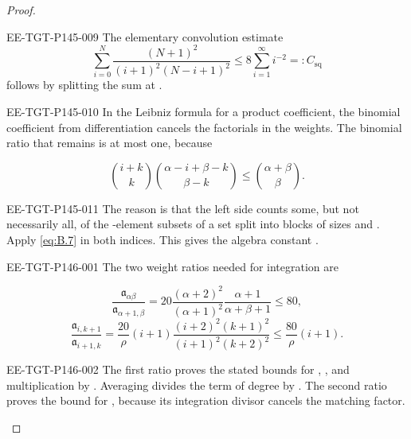 \begin{proof}
\begin{EESegment}{EE-TGT-P145-009}
  The elementary convolution estimate
\begin{equation}
  \sum_{i=0}^{N}\frac{(N+1)^2}{(i+1)^2(N-i+1)^2}
  \leq 8\sum_{i=1}^{\infty}i^{-2}=:C_{\mathrm{sq}}
  \tag{B.7}\label{eq:B.7}
\end{equation}
  follows by splitting the sum at .
\end{EESegment}
\begin{EESegment}{EE-TGT-P145-010}
In the Leibniz formula for a product coefficient, the binomial coefficient from differentiation
cancels the factorials in the weights. The binomial ratio that remains is at most one, because
\end{EESegment}
\begin{equation}
  \binom{i+k}{k}\binom{\alpha-i+\beta-k}{\beta-k}
  \leq\binom{\alpha+\beta}{\beta}.
  \tag{B.8}\label{eq:B.8}
\end{equation}
\begin{EESegment}{EE-TGT-P145-011}
The reason is that the left side counts some, but not necessarily all, of the
-element subsets of a set split into blocks of sizes
 and . Apply
\eqref{eq:B.7} in both indices. This gives the algebra constant
.
\end{EESegment}

%
\begin{EESegment}{EE-TGT-P146-001}
The two weight ratios needed for integration are
\end{EESegment}
\begin{equation}
  \frac{\mathfrak a_{\alpha\beta}}{\mathfrak a_{\alpha+1,\beta}}
  =20\frac{(\alpha+2)^2}{(\alpha+1)^2}\frac{\alpha+1}{\alpha+\beta+1}
  \leq80,
  \tag{B.9}\label{eq:B.9}
\end{equation}
\begin{equation}
  \frac{\mathfrak a_{i,k+1}}{\mathfrak a_{i+1,k}}
  =\frac{20}{\rho}(i+1)\frac{(i+2)^2(k+1)^2}{(i+1)^2(k+2)^2}
  \leq\frac{80}{\rho}(i+1).
  \tag{B.10}\label{eq:B.10}
\end{equation}
\begin{EESegment}{EE-TGT-P146-002}
The first ratio proves the stated bounds for ,
, and multiplication by . Averaging divides
the term of degree  by . The second ratio
proves the bound for , because its integration divisor
 cancels the matching factor.
\end{EESegment}


\end{proof}
